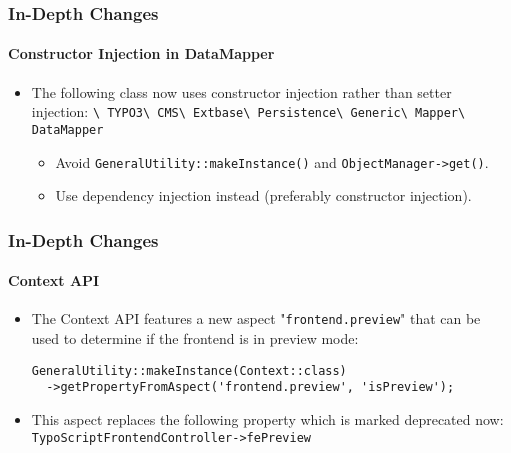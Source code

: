 \begin{frame}[fragile]
	\frametitle{In-Depth Changes}
	\framesubtitle{Constructor Injection in DataMapper}

	\begin{itemize}

		\item The following class now uses constructor injection rather than setter injection:
			\smaller
				\texttt{\textbackslash
					TYPO3\textbackslash
					CMS\textbackslash
					Extbase\textbackslash
					Persistence\textbackslash
					Generic\textbackslash
					Mapper\textbackslash
					DataMapper}
			\normalsize

			\begin{itemize}\smaller
				\item[\ding{228}] Avoid \texttt{GeneralUtility::makeInstance()} and \texttt{ObjectManager->get()}.
				\item[\ding{228}] Use dependency injection instead (preferably constructor injection).
			\end{itemize}\normalsize

	\end{itemize}

\end{frame}


\begin{frame}[fragile]
	\frametitle{In-Depth Changes}
	\framesubtitle{Context API}

	\lstset{basicstyle=\tiny\ttfamily}

	\begin{itemize}

		\item The Context API features a new aspect "\texttt{frontend.preview}"
			that can be used to determine if the frontend is in preview mode:
\begin{lstlisting}
GeneralUtility::makeInstance(Context::class)
  ->getPropertyFromAspect('frontend.preview', 'isPreview');
\end{lstlisting}

		\item This aspect replaces the following property which is marked deprecated now:
			\small\texttt{TypoScriptFrontendController->fePreview}\normalsize

	\end{itemize}

\end{frame}

